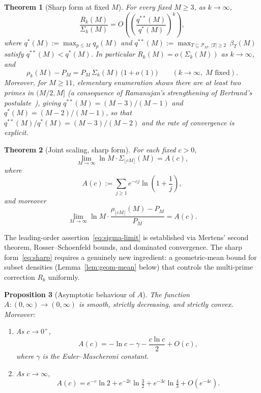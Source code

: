 \documentclass[11pt]{article}
\newtheorem{theorem}{Theorem}
\newtheorem{proposition}[theorem]{Proposition}
\theoremstyle{remark}
\newcommand{\PM}{\mathcal{P}_M}
\begin{document}
\begin{theorem}[Sharp form at fixed $M$]\label{thm:sharp-fixed-M}
For every fixed $M \geq 3$, as $k \to \infty$,
\begin{equation}\label{eq:sharp-fixed-M}
\frac{R_k(M)}{\Sigma_k(M)} = O\!\left(\left(\frac{q^{**}(M)}{q^{*}(M)}\right)^{\!k}\right),
\end{equation}
where $q^{*}(M) := \max_{p \leq M} q_p(M)$ and $q^{**}(M) := \max_{T \subseteq \PM,\, |T| \geq 2}\, \beta_T(M)$ satisfy $q^{**}(M) < q^{*}(M)$. In particular $R_k(M) = o(\Sigma_k(M))$ as $k \to \infty$, and
\[
\rho_k(M) - P_M = P_M\, \Sigma_k(M)\,\bigl(1 + o(1)\bigr) \qquad (k \to \infty,\; M \text{ fixed}).
\]
Moreover, for $M \geq 11$, elementary enumeration shows there are at least two primes in $(M/2, M]$ (a consequence of Ramanujan's strengthening of Bertrand's postulate~\cite{Ramanujan1919}), giving $q^{**}(M) = (M-3)/(M-1)$ and $q^{*}(M) = (M-2)/(M-1)$, so that $q^{**}(M)/q^{*}(M) = (M-3)/(M-2)$ and the rate of convergence is explicit.
\end{theorem}

\begin{theorem}[Joint scaling, sharp form]\label{thm:joint-sharp}
For each fixed $c > 0$,
\begin{equation}\label{eq:sigma-limit}
\lim_{M \to \infty} \ln M \cdot \Sigma_{\lfloor cM \rfloor}(M) = A(c),
\end{equation}
where
\begin{equation}\label{eq:A-def}
A(c) := \sum_{j \geq 1} e^{-cj} \ln\!\left(1 + \frac{1}{j}\right),
\end{equation}
and moreover
\begin{equation}\label{eq:sharp}
\lim_{M \to \infty} \ln M \cdot \frac{\rho_{\lfloor cM \rfloor}(M) - P_M}{P_M} = A(c).
\end{equation}
\end{theorem}

The leading-order assertion~\eqref{eq:sigma-limit} is established via Mertens' second theorem, Rosser--Schoenfeld bounds, and dominated convergence. The sharp form~\eqref{eq:sharp} requires a genuinely new ingredient: a geometric-mean bound for subset densities (Lemma~\ref{lem:geom-mean} below) that controls the multi-prime correction $R_k$ uniformly.

\begin{proposition}[Asymptotic behaviour of $A$]\label{prop:A-asymptotics}
The function $A \colon (0, \infty) \to (0, \infty)$ is smooth, strictly decreasing, and strictly convex. Moreover:
\begin{enumerate}[label=(\roman*), leftmargin=2em]
\item As $c \to 0^+$,
\[
A(c) = -\ln c - \gamma - \frac{c \ln c}{2} + O(c),
\]
where $\gamma$ is the Euler--Mascheroni constant.
\item As $c \to \infty$,
\[
A(c) = e^{-c} \ln 2 + e^{-2c} \ln \tfrac{3}{2} + e^{-3c}\ln\tfrac{4}{3} + O(e^{-4c}).
\]
\end{enumerate}
\end{proposition}
\end{document}
